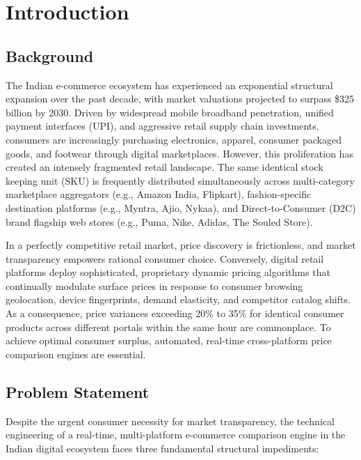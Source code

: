 \documentclass[12pt,a4paper,oneside]{report}
\begin{document}
\newpage
{}

\chapter{Introduction}

\section{Background}
The Indian e-commerce ecosystem has experienced an exponential structural expansion over the past decade, with market valuations projected to surpass \$325 billion by 2030. Driven by widespread mobile broadband penetration, unified payment interfaces (UPI), and aggressive retail supply chain investments, consumers are increasingly purchasing electronics, apparel, consumer packaged goods, and footwear through digital marketplaces. However, this proliferation has created an intensely fragmented retail landscape. The same identical stock keeping unit (SKU) is frequently distributed simultaneously across multi-category marketplace aggregators (e.g., Amazon India, Flipkart), fashion-specific destination platforms (e.g., Myntra, Ajio, Nykaa), and Direct-to-Consumer (D2C) brand flagship web stores (e.g., Puma, Nike, Adidas, The Souled Store).

In a perfectly competitive retail market, price discovery is frictionless, and market transparency empowers rational consumer choice. Conversely, digital retail platforms deploy sophisticated, proprietary dynamic pricing algorithms that continually modulate surface prices in response to consumer browsing geolocation, device fingerprints, demand elasticity, and competitor catalog shifts. As a consequence, price variances exceeding 20\% to 35\% for identical consumer products across different portals within the same hour are commonplace. To achieve optimal consumer surplus, automated, real-time cross-platform price comparison engines are essential.

\section{Problem Statement}
Despite the urgent consumer necessity for market transparency, the technical engineering of a real-time, multi-platform e-commerce comparison engine in the Indian digital ecosystem faces three fundamental structural impediments:
\end{document}

